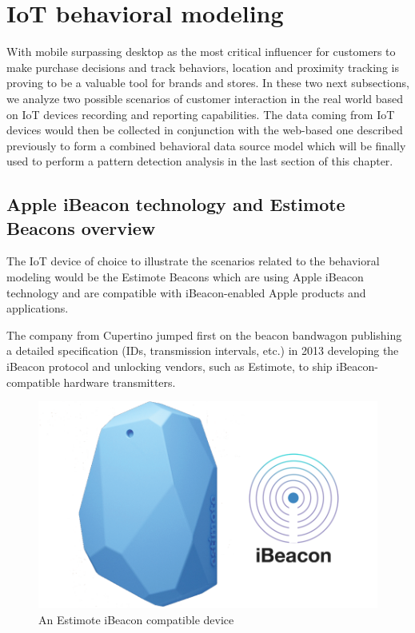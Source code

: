 \newpage
\section{IoT behavioral modeling}

With mobile surpassing desktop as the most critical influencer for customers to make purchase decisions and track behaviors, location and proximity tracking is proving to be a valuable tool for brands and stores.  In these two next subsections, we analyze two possible scenarios of customer interaction in the real world based on IoT devices recording and reporting capabilities. The data coming from IoT devices would then be collected in conjunction with the web-based one described previously to form a combined behavioral data source model which will be finally used to perform a pattern detection analysis in the last section of this chapter.

\subsection{Apple iBeacon technology and Estimote Beacons overview}

The IoT device of choice to illustrate the scenarios related to the behavioral modeling would be the Estimote Beacons which are using Apple iBeacon technology and are compatible with iBeacon-enabled Apple products and applications.

The company from Cupertino jumped first on the beacon bandwagon publishing a detailed specification (IDs, transmission intervals, etc.) in 2013 developing the iBeacon protocol and unlocking vendors, such as Estimote, to ship iBeacon-compatible hardware transmitters.

\vspace{0.5cm}
\begin{figure}[H]
  \centering
    \includegraphics[width=16cm]{images/ibeacon.png}
  \caption{An Estimote iBeacon compatible device}
  \label{fig:ifml2}
\end{figure}
\vspace{0.5cm}

